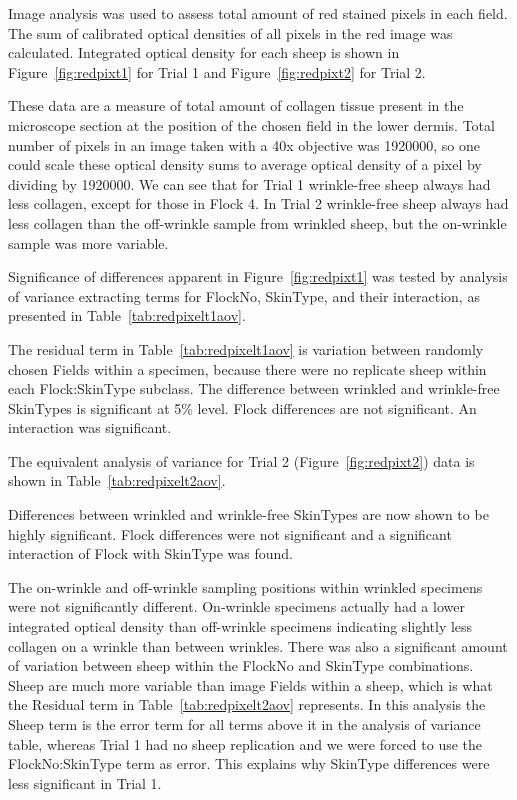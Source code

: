\documentclass[]{interact}
\theoremstyle{plain}%
\theoremstyle{definition}
\theoremstyle{remark}
\begin{document}
 Image analysis was used to assess total amount of red stained pixels in each field.  The sum of calibrated optical densities of all pixels in the red image was calculated. Integrated optical density for each sheep is shown  in Figure~\ref{fig:redpixt1} for Trial 1 and Figure~\ref{fig:redpixt2} for Trial 2.


These data are a measure of total amount of collagen tissue present in the microscope section at the position of the chosen field in the lower dermis.
Total number of pixels in an image taken with a 40x objective was 1920000, so one could scale these optical density sums to average optical density of a pixel by dividing by 1920000. 
We can see that for Trial 1 wrinkle-free sheep always had less collagen, except for those in Flock 4. In Trial 2  wrinkle-free sheep always had less collagen than the off-wrinkle sample from wrinkled sheep, but the on-wrinkle sample was more variable.

Significance of differences apparent in Figure~\ref{fig:redpixt1} was tested by analysis of variance extracting terms for FlockNo, SkinType, and their interaction, as presented in Table~\ref{tab:redpixelt1aov}.

The residual term in Table~\ref{tab:redpixelt1aov} is variation between randomly chosen Fields within a specimen, because there were no replicate sheep within each Flock:SkinType subclass. The difference between wrinkled and wrinkle-free SkinTypes is significant at 5\% level. Flock differences are not significant. An interaction was significant.

The equivalent analysis of variance for Trial 2 (Figure~\ref{fig:redpixt2}) data is shown in Table~\ref{tab:redpixelt2aov}.

Differences between wrinkled and wrinkle-free SkinTypes are now shown to be highly significant. Flock differences were not significant and a significant interaction of Flock with SkinType was found.  

 The on-wrinkle and off-wrinkle sampling positions within wrinkled specimens were not significantly different. On-wrinkle specimens actually had a lower integrated optical density than off-wrinkle specimens indicating slightly less collagen on a wrinkle than between wrinkles.
There was also a significant amount of variation between sheep within the FlockNo and SkinType combinations. Sheep are much more variable than image Fields within a sheep, which is what the Residual term in Table~\ref{tab:redpixelt2aov} represents. In this analysis the Sheep term is the error term for all terms above it in the analysis of variance table, whereas Trial 1 had no sheep replication and we were forced to use the FlockNo:SkinType term as error. This explains why SkinType differences were less significant in Trial 1. 
\end{document}
